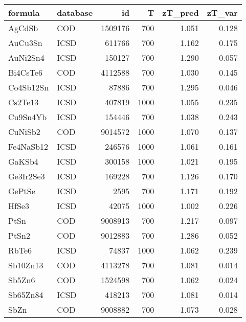 \begin{tabular}{llrrrr}
\toprule
   formula & database &       id &     T &  zT\_pred &  zT\_var \\
\midrule
    AgCdSb &      COD &  1509176 &   700 &    1.051 &   0.128 \\
   AuCu3Sn &     ICSD &   611766 &   700 &    1.162 &   0.175 \\
  AuNi2Sn4 &     ICSD &   150127 &   700 &    1.290 &   0.057 \\
  Bi4CsTe6 &      COD &  4112588 &   700 &    1.030 &   0.145 \\
 Co4Sb12Sn &     ICSD &    87886 &   700 &    1.295 &   0.046 \\
   Cs2Te13 &     ICSD &   407819 &  1000 &    1.055 &   0.235 \\
  Cu9Sn4Yb &     ICSD &   154446 &   700 &    1.038 &   0.243 \\
   CuNiSb2 &      COD &  9014572 &  1000 &    1.070 &   0.137 \\
 Fe4NaSb12 &     ICSD &   246576 &  1000 &    1.061 &   0.161 \\
    GaKSb4 &     ICSD &   300158 &  1000 &    1.021 &   0.195 \\
 Ge3Ir2Se3 &     ICSD &   169228 &   700 &    1.126 &   0.170 \\
    GePtSe &     ICSD &     2595 &   700 &    1.171 &   0.192 \\
     HfSe3 &     ICSD &    42075 &  1000 &    1.002 &   0.226 \\
      PtSn &      COD &  9008913 &   700 &    1.217 &   0.097 \\
     PtSn2 &      COD &  9012883 &   700 &    1.286 &   0.052 \\
     RbTe6 &     ICSD &    74837 &  1000 &    1.062 &   0.239 \\
  Sb10Zn13 &      COD &  4113278 &   700 &    1.081 &   0.014 \\
    Sb5Zn6 &      COD &  1524598 &   700 &    1.062 &   0.024 \\
  Sb65Zn84 &     ICSD &   418213 &   700 &    1.081 &   0.014 \\
      SbZn &      COD &  9008882 &   700 &    1.073 &   0.028 \\
\bottomrule
\end{tabular}
